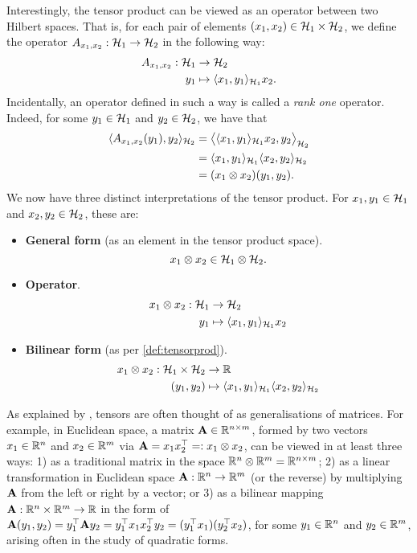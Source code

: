 Interestingly, the tensor product can be viewed as an operator between two Hilbert spaces.
That is, for each pair of elements $(x_1,x_2) \in {\mathcal H}_1\times{\mathcal H}_2$, we define the operator $A_{x_1,x_2}:{\mathcal H}_1\to{\mathcal H}_2$ in the following way:
\begin{align*}
  A_{x_1,x_2}:{\mathcal H}_1&\to{\mathcal H}_2 \\
  y_1&\mapsto \langle x_1,y_1\rangle_{{\mathcal H}_1}x_2.
\end{align*}
Incidentally, an operator defined in such a way is called a \emph{rank one} operator.
Indeed, for some $y_1\in{\mathcal H}_1$ and $y_2\in{\mathcal H}_2$, we have that
\vspace{-0.5em}
\begin{align*}
  \langle A_{x_1,x_2}(y_1),y_2\rangle_{{\mathcal H}_2} 
  &= \big\langle \langle x_1,y_1\rangle_{{\mathcal H}_1}x_2 , y_2 \big\rangle_{{\mathcal H}_2} \\
  &= \langle x_1,y_1\rangle_{{\mathcal H}_1}\langle x_2,y_2\rangle_{{\mathcal H}_2} \\
  &= (x_1\otimes x_2)(y_1,y_2). 
\end{align*}
We now have three distinct interpretations of the tensor product.
For $x_1,y_1\in{\mathcal H}_1$ and $x_2,y_2\in{\mathcal H}_2$, these are:
\begin{itemize}
  \item \textbf{General form} (as an element in the tensor product space).
  \[
    x_1 \otimes x_2 \in {\mathcal H}_1 \otimes {\mathcal H}_2. 
  \]
  \item \textbf{Operator}.
  \begin{align*}
    x_1 \otimes x_2:{\mathcal H}_1 &\to {\mathcal H}_2 \\
    y_1 &\mapsto \langle x_1,y_1\rangle_{{\mathcal H}_1}x_2 
  \end{align*}  
  \item \textbf{Bilinear form} (as per \cref{def:tensorprod}). 
  \begin{align*}
    x_1 \otimes x_2:{\mathcal H}_1 \times {\mathcal H}_2 &\to \mathbb{R} \\
    (y_1,y_2) &\mapsto \langle x_1,y_1\rangle_{{\mathcal H}_1}\langle x_2,y_2\rangle_{{\mathcal H}_2}
  \end{align*}
\end{itemize}

\begin{remark}
  As explained by \citet[sec. 10.5, p. 227]{kokoszka2017introduction}, tensors are often thought of as generalisations of matrices.
  For example, in Euclidean space, a matrix ${\mathbf A} \in \mathbb{R}^{n\times m}$, formed by two vectors $x_1\in\mathbb{R}^n$ and $x_2\in\mathbb{R}^m$ via ${\mathbf A} = x_1x_2^\top =: x_1 \otimes x_2$, can be viewed in at least three ways: 
  1) as a traditional matrix in the space $\mathbb{R}^n \otimes \mathbb{R}^m = \mathbb{R}^{n\times m}$; 
  2) as a linear transformation in Euclidean space ${\mathbf A}:\mathbb{R}^n\to\mathbb{R}^m$ (or the reverse) by multiplying ${\mathbf A}$ from the left or right by a vector; or
  3) as a bilinear mapping ${\mathbf A}:\mathbb{R}^n \times \mathbb{R}^m \to \mathbb{R}$ in the form of ${\mathbf A}(y_1,y_2) = y_1^\top{\mathbf A} y_2 = y_1^\top x_1 x_2^\top y_2 = (y_1^\top x_1)(y_2^\top x_2)$, for some $y_1\in\mathbb{R}^n$ and $y_2\in\mathbb{R}^m$, arising often in the study of quadratic forms.
\end{remark}

